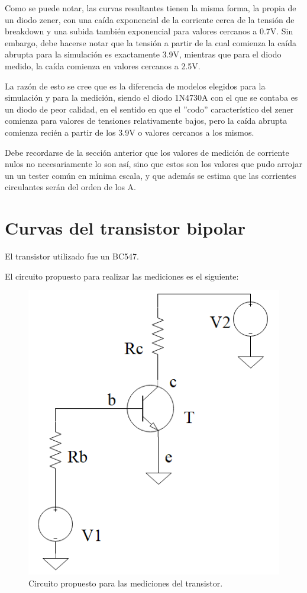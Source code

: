 \documentclass[../../e1_tp1_main.tex]{subfiles}
\begin{document}
	Como se puede notar, las curvas resultantes tienen la misma forma, la propia de un diodo zener, con una caída exponencial de la corriente cerca de la tensión de breakdown y una subida también exponencial para valores cercanos a 0.7V. Sin embargo, debe hacerse notar que la tensión a partir de la cual comienza la caída abrupta para la simulación es exactamente 3.9V, mientras que para el diodo medido, la caída comienza en valores cercanos a 2.5V.\par
	 La razón de esto se cree que es la diferencia de modelos elegidos para la simulación y para la medición, siendo el diodo 1N4730A con el que se contaba es un diodo de peor calidad, en el sentido en que el ''codo'' característico del zener comienza para valores de tensiones relativamente bajos, pero la caída abrupta comienza recién a partir de los 3.9V o valores cercanos a los mismos.\par 
	Debe recordarse de la sección anterior que los valores de medición de corriente nulos no necesariamente lo son así, sino que estos son los valores que pudo arrojar un un tester común en mínima escala, y que además se estima que las corrientes circulantes serán del orden de los \micro A. \par

\section{Curvas del transistor bipolar}

 El transistor utilizado fue un BC547. \par

 	El circuito propuesto para realizar las mediciones es el siguiente:

	\begin{figure}[H]	%
		\centering
		\includegraphics[scale=1.2]{imagenes/circuito_transistor.png}
		\caption{Circuito propuesto para las mediciones del transistor.}
		\label{fig:ej5_circuito_transistor}
	\end{figure}
	
\end{document}
